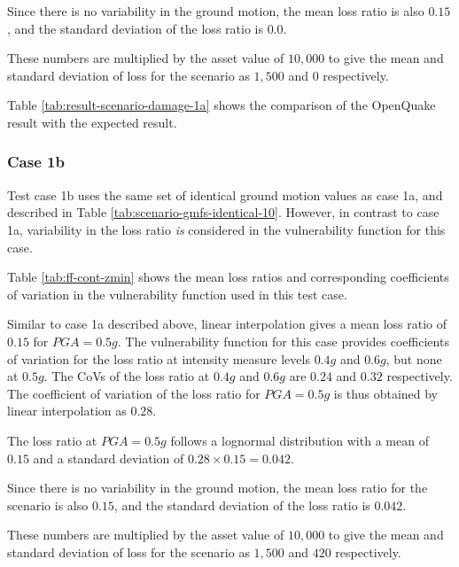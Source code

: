 Since there is no variability in the ground motion, the mean loss ratio is also $0.15$, and the standard deviation of the loss ratio is $0.0$.

These numbers are multiplied by the asset value of $10,000$ to give the mean and standard deviation of loss for the scenario as $1,500$ and $0$ respectively.



Table \ref{tab:result-scenario-damage-1a} shows the comparison of the OpenQuake result with the expected result.

\subsubsection{Case 1b}
Test case 1b uses the same set of identical ground motion values as case 1a, and described in Table \ref{tab:scenario-gmfs-identical-10}. However, in contrast to case 1a, variability in the loss ratio \emph{is} considered in the vulnerability function for this case.



Table \ref{tab:ff-cont-zmin} shows the mean loss ratios and corresponding coefficients of variation in the vulnerability function used in this test case.

Similar to case 1a described above, linear interpolation gives a mean loss ratio of $0.15$ for $PGA = 0.5 g$. The vulnerability function for this case provides coefficients of variation for the loss ratio at intensity measure levels $0.4 g$ and $0.6 g$, but none at $0.5 g$. The CoVs of the loss ratio at $0.4 g$ and $0.6 g$ are $0.24$ and $0.32$ respectively. The coefficient of variation of the loss ratio for $PGA = 0.5 g$ is thus obtained by linear interpolation as $0.28$.

The loss ratio at $PGA = 0.5 g$ follows a lognormal distribution with a mean of $0.15$ and a standard deviation of $0.28 \times 0.15 = 0.042$.

Since there is no variability in the ground motion, the mean loss ratio for the scenario is also $0.15$, and the standard deviation of the loss ratio is $0.042$.

These numbers are multiplied by the asset value of $10,000$ to give the mean and standard deviation of loss for the scenario as $1,500$ and $420$ respectively.



